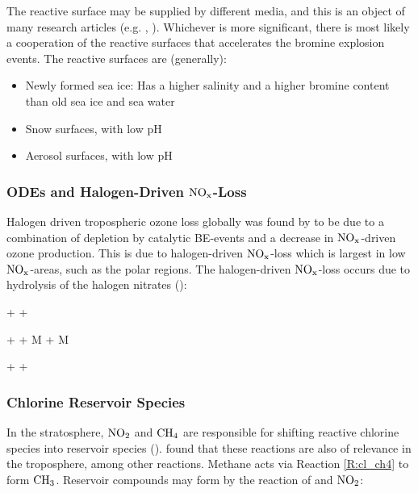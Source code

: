 The reactive surface may be supplied by different media, and this is an object of many research articles (e.g. \cite{KerriAPratt2013}, \cite{Rankin}). Whichever is more significant, there is most likely a cooperation of the reactive surfaces that accelerates the bromine explosion events. The reactive surfaces are (generally): 

\begin{itemize}
    \item Newly formed sea ice: Has a higher salinity and a higher bromine content than old sea ice and sea water \cite{Rankin}
    \item Snow surfaces, with low pH
    \item Aerosol surfaces, with low pH
\end{itemize}

\subsubsection{ODEs and Halogen-Driven $\mathrm{NO_x}$-Loss}

Halogen driven tropospheric ozone loss globally was found by \cite{Schmidt} to be due to a combination of depletion by catalytic BE-events and a decrease in $\mathrm{NO_x}$-driven ozone production. This is due to halogen-driven $\mathrm{NO_x}$-loss which is largest in low $\mathrm{NO_x}$-areas, such as the polar regions. The halogen-driven $\mathrm{NO_x}$-loss occurs due to hydrolysis of the halogen nitrates (\cite{Schmidt}):

\begin{reaction}
     +  \rightarrow {} + 
    \label{R:14}
\end{reaction}


\begin{reaction}
     +  + M \rightarrow {} + M
    \label{R:9}
\end{reaction}


\begin{reaction}
     +    + 
    \label{R:13}
\end{reaction}




\subsubsection{Chlorine Reservoir Species}

In the stratosphere, $\mathrm{NO_2}$ and $\mathrm{CH_4}$ are responsible for shifting reactive chlorine species into reservoir species (\cite{SeinfeldSpyros}). \cite{Wang_2019} found that these reactions are also of relevance in the troposphere, among other reactions. Methane acts via Reaction \ref{R:cl_ch4} to form $\mathrm{CH_3}$. Reservoir compounds may form by the reaction of  and $\mathrm{NO_2}$: 

